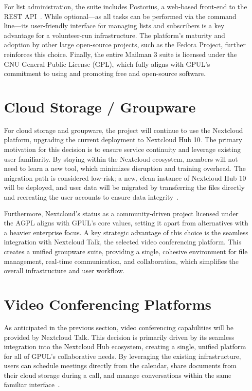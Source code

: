 For list administration, the suite includes Postorius, a web-based front-end to the REST API~\cite{postorius-docs}. While optional—as all tasks can be performed via the command line—its user-friendly interface for managing lists and subscribers is a key advantage for a volunteer-run infrastructure. The platform's maturity and adoption by other large open-source projects, such as the Fedora Project, further reinforces this choice. Finally, the entire Mailman 3 suite is licensed under the GNU General Public License (GPL), which fully aligns with GPUL's commitment to using and promoting free and open-source software.

\section{Cloud Storage / Groupware}

For cloud storage and groupware, the project will continue to use the Nextcloud platform, upgrading the current deployment to Nextcloud Hub 10. The primary motivation for this decision is to ensure service continuity and leverage existing user familiarity. By staying within the Nextcloud ecosystem, members will not need to learn a new tool, which minimizes disruption and training overhead. The migration path is considered low-risk; a new, clean instance of Nextcloud Hub 10 will be deployed, and user data will be migrated by transferring the files directly and recreating the user accounts to ensure data integrity~\cite{nextcloud-docs}.

Furthermore, Nextcloud's status as a community-driven project licensed under the AGPL aligns with GPUL's core values, setting it apart from alternatives with a heavier enterprise focus. A key strategic advantage of this choice is the seamless integration with Nextcloud Talk, the selected video conferencing platform. This creates a unified groupware suite, providing a single, cohesive environment for file management, real-time communication, and collaboration, which simplifies the overall infrastructure and user workflow.

\section{Video Conferencing Platforms}

As anticipated in the previous section, video conferencing capabilities will be provided by Nextcloud Talk. This decision is primarily driven by its seamless integration into the Nextcloud Hub ecosystem, creating a single, unified platform for all of GPUL's collaborative needs. By leveraging the existing infrastructure, users can schedule meetings directly from the calendar, share documents from their cloud storage during a call, and manage conversations within the same familiar interface~\cite{nextcloud-talk-docs}.

